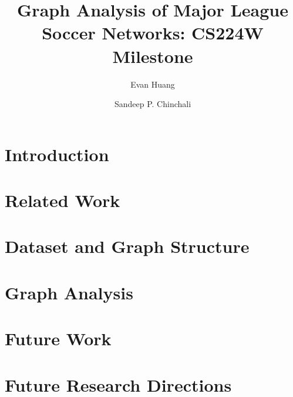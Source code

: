 \documentclass[newfonts=false,format=sigconf,10pt,letterpaper]{acmart}
\begin{document}

\title{Graph Analysis of Major League Soccer Networks: CS224W Milestone}

\author{Evan Huang}

\author{Sandeep P. Chinchali}

\maketitle

\section{Introduction}
\label{sec:introduction}


\section{Related Work}
\label{sec:related_work}


\section{Dataset and Graph Structure}
\label{sec:dataset}


\section{Graph Analysis}
\label{sec:evaluation}

\section{Future Work}
\label{sec:discussion}

\section{Future Research Directions}
\label{sec:future_research}


\balance
 
\begin{small}

\end{small}
\end{document}
